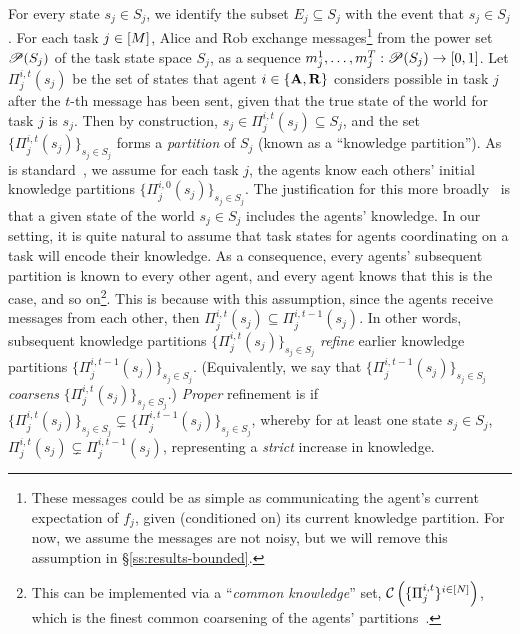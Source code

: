 For every state $s_j \in S_j$, we identify the subset $E_j \subseteq S_j$ with the event that $s_j \in S_j$.
For each task $j \in [M]$, Alice and Rob exchange messages\footnote{These messages could be as simple as communicating the agent's current expectation of $f_j$, given (conditioned on) its current knowledge partition. For now, we assume the messages are not noisy, but we will remove this assumption in \S\ref{ss:results-bounded}.} from the power set $\mathscr{P}(S_j)$ of the task state space $S_j$, as a sequence $m^{1}_j,\dots,m^{T}_j:\mathscr{P}(S_j) \to [0,1]$.
Let $\Pi_j^{i,t}(s_j)$ be the set of states that agent $i \in \{\mathbf{A}, \mathbf{R}\}$ considers possible in task $j$ after the $t$-th message has been sent, given that the true state of the world for task $j$ is $s_j$.
Then by construction, $s_j \in \Pi_j^{i,t}(s_j) \subseteq S_j$, and the set $\{\Pi_j^{i,t}(s_j)\}_{s_j \in S_j}$ forms a \emph{partition} of $S_j$ (known as a ``knowledge partition'').
As is standard~\citep{aumann1976agreeing,aumann1999interactive,aaronson2005complexity,hellman2013almost}, we assume for each task $j$, the agents know each others' initial knowledge partitions $\{\Pi_j^{i,0}(s_j)\}_{s_j \in S_j}$.
The justification for this more broadly~\citep{aumann1976agreeing,aumann1999interactive} is that a given state of the world $s_j \in S_j$ includes the agents' knowledge.
In our setting, it is quite natural to assume that task states for agents coordinating on a task will encode their knowledge.
As a consequence, every agents' subsequent partition is known to every other agent, and every agent knows that this is the case, and so on\footnote{This can be implemented via a ``\emph{common knowledge}'' set, $\mathcal{C}\left(\{\Pi_j^{i,t}\}^{i \in [N]}\right)$, which is the finest common coarsening of the agents' partitions~\citep{aumann1976agreeing}.}.
This is because with this assumption, since the agents receive messages from each other, then $\Pi_j^{i,t}(s_j) \subseteq \Pi_j^{i,t-1}(s_j)$.
In other words, subsequent knowledge partitions $\{\Pi_j^{i,t}(s_j)\}_{s_j \in S_j}$ \emph{refine} earlier knowledge partitions $\{\Pi_j^{i,t-1}(s_j)\}_{s_j \in S_j}$.
(Equivalently, we say that $\{\Pi_j^{i,t-1}(s_j)\}_{s_j \in S_j}$ \emph{coarsens} $\{\Pi_j^{i,t}(s_j)\}_{s_j \in S_j}$.)
\emph{Proper} refinement is if $\{\Pi_j^{i,t}(s_j)\}_{s_j \in S_j} \subsetneq \{\Pi_j^{i,t-1}(s_j)\}_{s_j \in S_j}$, whereby for at least one state $s_j \in S_j$, $\Pi_j^{i,t}(s_j) \subsetneq \Pi_j^{i,t-1}(s_j)$, representing a \emph{strict} increase in knowledge.

